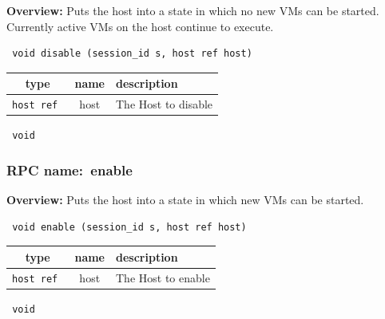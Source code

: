 {\bf Overview:} 
Puts the host into a state in which no new VMs can be started. Currently active VMs on the host continue to execute.

\begin{verbatim} void disable (session_id s, host ref host)\end{verbatim}



 
\vspace{0.3cm}
\begin{tabular}{|c|c|p{7cm}|}
 \hline
{\bf type} & {\bf name} & {\bf description} \\ \hline
{\tt host ref } & host & The Host to disable \\ \hline 

\end{tabular}

\vspace{0.3cm}

{\tt 
void
}



\vspace{0.3cm}
\vspace{0.3cm}
\vspace{0.3cm}
\subsubsection{RPC name:~enable}

{\bf Overview:} 
Puts the host into a state in which new VMs can be started.

\begin{verbatim} void enable (session_id s, host ref host)\end{verbatim}



 
\vspace{0.3cm}
\begin{tabular}{|c|c|p{7cm}|}
 \hline
{\bf type} & {\bf name} & {\bf description} \\ \hline
{\tt host ref } & host & The Host to enable \\ \hline 

\end{tabular}

\vspace{0.3cm}

{\tt 
void
}



